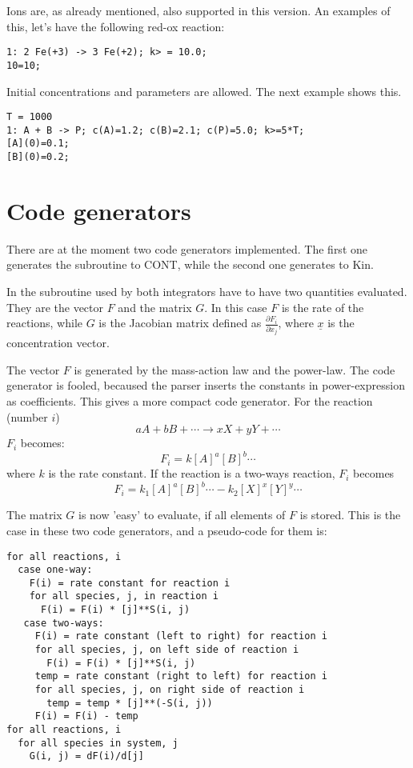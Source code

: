 Ions are, as already mentioned, also supported in this version. An examples
of this, let's have the following red-ox reaction:
\begin{verbatim}
1: 2 Fe(+3) -> 3 Fe(+2); k> = 10.0;
10=10;
\end{verbatim}

Initial concentrations and parameters are allowed. The next example shows this.
\begin{verbatim}
T = 1000
1: A + B -> P; c(A)=1.2; c(B)=2.1; c(P)=5.0; k>=5*T;
[A](0)=0.1;
[B](0)=0.2;
\end{verbatim}

\section{Code generators}
There are at the moment two code generators implemented. The first one generates
the subroutine to CONT, while the second one generates to Kin.

In the subroutine used by both integrators have to have two quantities evaluated. They are the vector
$F$ and the matrix $G$. In this case $F$ is the rate of the reactions, while $G$ is 
the Jacobian matrix defined as $\frac{\partial F_i}{\partial x_j}$, where $\underline{x}$ is the 
concentration vector. 

The vector $F$ is generated by the mass-action law and the power-law. The code generator
is fooled, becaused the parser inserts the constants in power-expression as coefficients.
This gives a more compact code generator. For the reaction (number $i$)
\[ a A + b B + \cdots \rightarrow x X + y Y + \cdots \]
$F_i$ becomes:
\[ F_i = k [A]^a [B]^b \cdots \]
where $k$ is the rate constant. If the reaction is a two-ways reaction, $F_i$ becomes
\[ F_i = k_1 [A]^a [B]^b \cdots - k_2 [X]^x [Y]^y \cdots \]

The matrix $G$ is now 'easy' to evaluate, if all elements of $F$ is stored. 
This is the case in these two code generators, and a pseudo-code for them is:
\begin{verbatim}
for all reactions, i
  case one-way:
    F(i) = rate constant for reaction i 
    for all species, j, in reaction i
      F(i) = F(i) * [j]**S(i, j)
   case two-ways:
     F(i) = rate constant (left to right) for reaction i
     for all species, j, on left side of reaction i
       F(i) = F(i) * [j]**S(i, j)
     temp = rate constant (right to left) for reaction i
     for all species, j, on right side of reaction i
       temp = temp * [j]**(-S(i, j))
     F(i) = F(i) - temp
for all reactions, i 
  for all species in system, j
    G(i, j) = dF(i)/d[j]
\end{verbatim}

